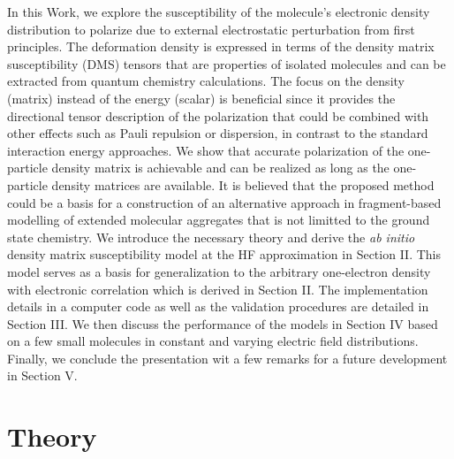 \documentclass[aip,graphicx]{revtex4-1}
\begin{document}
In this Work, we explore the susceptibility of the molecule's electronic density distribution
to polarize due to external electrostatic perturbation from first principles. 
The deformation density is expressed in terms
of the density matrix susceptibility (DMS) tensors that are properties of isolated molecules and can be
extracted from quantum chemistry calculations. The focus on the density (matrix) instead of the energy
(scalar) is beneficial since it provides the directional tensor description
of the polarization that could be combined with other effects such as Pauli repulsion or dispersion,
in contrast to the standard interaction energy approaches. We show that accurate polarization 
of the one\hyp{}particle density
matrix is achievable and can be realized as long as the one\hyp{}particle density matrices
are available. It is believed that the proposed method
could be a basis for a construction of an 
alternative approach in fragment\hyp{}based
modelling of extended molecular aggregates that is not limitted to the ground state chemistry.
We introduce the necessary theory and derive the \emph{ab initio} density matrix susceptibility model
at the HF approximation in Section II. This model serves as a basis for generalization to the 
arbitrary one\hyp{}electron density with electronic correlation which is derived in Section II. 
The implementation details in a computer code as well as the validation procedures are detailed
in Section III. We then discuss the performance of the models in Section IV based on a few small molecules
in constant and varying electric field distributions. Finally, we conclude the presentation wit a few 
remarks for a future development in Section V.

%

\section{\label{s:2}Theory}
\end{document}

